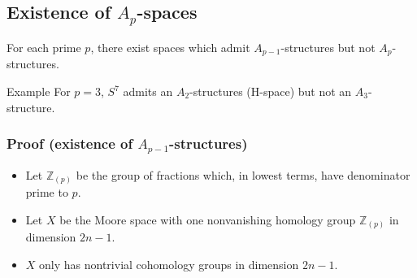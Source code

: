 \documentclass{beamer}
\theoremstyle{definition}
\newcommand{\Z}{\mathbb{Z}}
\begin{document}
\subsection{Existence of $A_p$-spaces}
\begin{frame}[fragile]
\begin{theorem}
For each prime $p$, there exist spaces which admit $A_{p-1}$-structures but not $A_p$-structures.
\end{theorem}\pause
\begin{block}{Example}
For $p=3$, $S^7$ admits an $A_2$-structures (H-space) but not an $A_3$-structure.
\end{block}
\end{frame}
\begin{frame}
\frametitle{Proof (existence of $A_{p-1}$-structures)}
\begin{itemize}
\item<1-> Let $\Z_{(p)}$ be the group of fractions which, in lowest terms, have denominator prime to $p$. %
\item<2-> Let $X$ be the Moore space with one nonvanishing homology group $\Z_{(p)}$ in dimension $2n-1$. %
\item<3-> $X$ only has nontrivial cohomology groups in dimension $2n-1$.
\end{itemize}
\end{frame}
\end{document}

